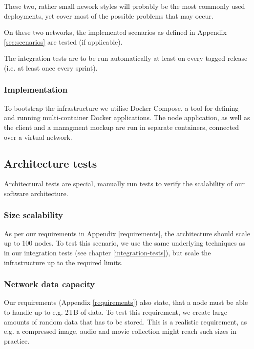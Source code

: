 These two, rather small nework styles will probably be the most commonly used deployments, yet cover most of the possible problems that may occur.

On these two networks, the implemented scenarios as defined in Appendix \ref{sec:scenarios} are tested (if applicable).

The integration tests are to be run automatically at least on every tagged release (i.e. at least once every sprint).

\subsubsection{Implementation}

To bootstrap the infrastructure we utilise Docker Compose, a tool for defining and running multi-container Docker applications\cite{docker-compose}. The node application, as well as the client and a managment mockup are run in separate containers, connected over a virtual network.

\subsection{Architecture tests}

Architectural tests are special, manually run tests to verify the scalability of our software architecture.

\subsubsection{Size scalability}
As per our requirements in Appendix \ref{requirements}, the architecture should scale up to 100 nodes. To test this scenario, we use the same underlying techniques as in our integration tests (see chapter \ref{integration-tests}), but scale the infrastructure up to the required limits.

\subsubsection{Network data capacity}
Our requirements (Appendix \ref{requirements}) also state, that a node must be able to handle up to e.g. 2TB of data. To test this requirement, we create large amounts of random data that has to be stored. This is a realistic requirement, as e.g. a compressed image, audio and movie collection might reach such sizes in practice.
